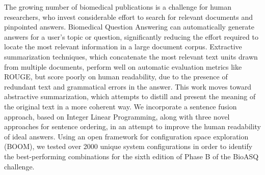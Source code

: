 The growing number of biomedical publications is a challenge for human researchers, who invest considerable effort to search for relevant documents and pinpointed answers. Biomedical Question Answering can automatically generate answers for a user's topic or question, significantly reducing the effort required to locate the most relevant information in a large document corpus. Extractive summarization techniques, which concatenate the most relevant text units drawn from multiple documents, perform well on automatic evaluation metrics like ROUGE, but score poorly on human readability, due to the presence of redundant text and grammatical errors in the answer. This work moves toward abstractive summarization, which attempts to distill and present the meaning of the original text in a more coherent way. We incorporate a sentence fusion approach, based on Integer Linear Programming, along with three novel approaches for sentence ordering, in an attempt to improve the human readability of ideal answers. Using an open framework for configuration space exploration (BOOM), we tested over 2000 unique system configurations in order to identify the best-performing combinations for the sixth edition of Phase B of the BioASQ challenge.
